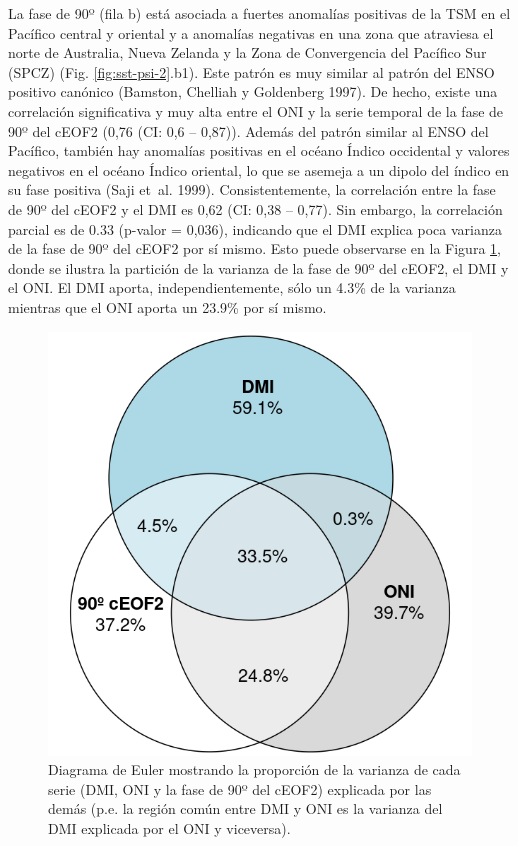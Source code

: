 \documentclass[12pt,oneside,a4paper]{reedthesis}
\begin{document}
La fase de 90º (fila b) está asociada a fuertes anomalías positivas de la TSM en el Pacífico central y oriental y a anomalías negativas en una zona que atraviesa el norte de Australia, Nueva Zelanda y la Zona de Convergencia del Pacífico Sur (SPCZ) (Fig. \ref{fig:sst-psi-2}.b1).
Este patrón es muy similar al patrón del ENSO positivo canónico (Bamston, Chelliah y Goldenberg 1997).
De hecho, existe una correlación significativa y muy alta entre el ONI y la serie temporal de la fase de 90º del cEOF2 (0,76 (CI: 0,6 -- 0,87)).
Además del patrón similar al ENSO del Pacífico, también hay anomalías positivas en el océano Índico occidental y valores negativos en el océano Índico oriental, lo que se asemeja a un dipolo del índico en su fase positiva (Saji et~al. 1999).
Consistentemente, la correlación entre la fase de 90º del cEOF2 y el DMI es 0,62 (CI: 0,38 -- 0,77).
Sin embargo, la correlación parcial es de 0.33 (p-valor = 0,036), indicando que el DMI explica poca varianza de la fase de 90º del cEOF2 por sí mismo.
Esto puede observarse en la Figura \ref{fig:euler}, donde se ilustra la partición de la varianza de la fase de 90º del cEOF2, el DMI y el ONI.
El DMI aporta, independientemente, sólo un 4.3\% de la varianza mientras que el ONI aporta un 23.9\% por sí mismo.

\begin{figure}

{\centering \includegraphics{figures/20-ceofs/euler-1} 

}

\caption{Diagrama de Euler mostrando la proporción de la varianza de cada serie (DMI, ONI y la fase de 90º del cEOF2) explicada por las demás (p.e. la región común entre DMI y ONI es la varianza del DMI explicada por el ONI y viceversa).}\label{fig:euler}
\end{figure}
\end{document}
